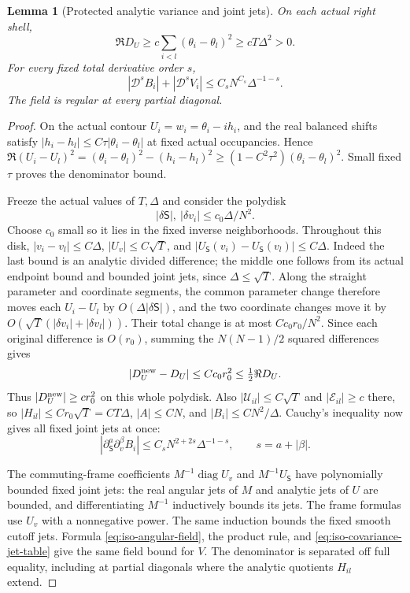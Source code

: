\documentclass[11pt]{article}
\numberwithin{equation}{section}
\newtheorem{lemma}[theorem]{Lemma}
\theoremstyle{definition}
\begin{document}
\begin{lemma}[Protected analytic variance and joint jets]
\label{lem:iso-covariance-jets}
On each actual right shell,
\begin{equation}\label{eq:iso-covariance-lower}
 \Re D_U\ge c\sum_{i<l}(\theta_i-\theta_l)^2
                   \ge cT\Delta^2>0.
\end{equation}
For every fixed total derivative order $s$,
\begin{equation}\label{eq:iso-field-jets}
 |\mathcal D^s B_i|+|\mathcal D^s V_i|
       \le C_sN^{C_s}\Delta^{-1-s}.
\end{equation}
The field is regular at every partial diagonal.
\end{lemma}
\begin{proof}
On the actual contour $U_i=w_i=\theta_i-ih_i$, and the real
balanced shifts satisfy
$|h_i-h_l|\le C\tau|\theta_i-\theta_l|$ at fixed actual occupancies.
Hence
$\Re(U_i-U_l)^2=(\theta_i-\theta_l)^2-(h_i-h_l)^2
 \ge(1-C^2\tau^2)(\theta_i-\theta_l)^2$.
Small fixed $\tau$ proves the denominator bound.

Freeze the actual values of $T,\Delta$ and consider the polydisk
\[
 |\delta\mathsf S|,\ |\delta v_i|\le c_0\Delta/N^2.
\]
Choose $c_0$ small so it lies in the fixed inverse neighborhoods.
Throughout this disk, $|v_i-v_l|\le C\Delta$,
$|U_v|\le C\sqrt T$, and
$|U_{\mathsf S}(v_i)-U_{\mathsf S}(v_l)|\le C\Delta$.
Indeed the last bound is an analytic divided difference; the middle
one follows from its actual endpoint bound and bounded joint jets,
since $\Delta\le\sqrt T$.
Along the straight parameter and coordinate segments, the common
parameter change therefore moves each $U_i-U_l$ by $O(\Delta
|\delta\mathsf S|)$, and the two coordinate changes move it by
$O(\sqrt T(|\delta v_i|+|\delta v_l|))$.
Their total change is at most $Cc_0r_0/N^2$.
Since each original difference is $O(r_0)$, summing the $N(N-1)/2$
squared differences gives
\[
 |D_U^{\rm new}-D_U|\le Cc_0r_0^2\le\tfrac12\Re D_U.
\]
Thus $|D_U^{\rm new}|\ge cr_0^2$ on this whole polydisk.
Also $|\mathcal U_{il}|\le C\sqrt T$ and
$|\mathcal E_{il}|\ge c$ there, so
$|H_{il}|\le Cr_0\sqrt T=CT\Delta$, $|A|\le CN$, and
$|B_i|\le CN^2/\Delta$.
Cauchy's inequality now gives all fixed joint jets at once:
\begin{equation}\label{eq:iso-covariance-jet-table}
 |\partial_{\mathsf S}^a\partial_v^\beta B_i|
 \le C_sN^{2+2s}\Delta^{-1-s},\qquad s=a+|\beta|.
\end{equation}

The commuting-frame coefficients
$M^{-1}\operatorname{diag}U_v$ and $M^{-1}U_{\mathsf S}$ have
polynomially bounded fixed joint jets: the real angular jets of
$M$ and analytic jets of $U$ are bounded, and differentiating
$M^{-1}$ inductively bounds its jets. The frame formulas use $U_v$
with a nonnegative power. The same induction bounds the fixed
smooth cutoff jets.
Formula \eqref{eq:iso-angular-field}, the product rule, and
\eqref{eq:iso-covariance-jet-table} give the same field bound for $V$.
The denominator is separated off full equality, including at partial
diagonals where the analytic quotients $H_{il}$ extend.
\end{proof}
\end{document}
